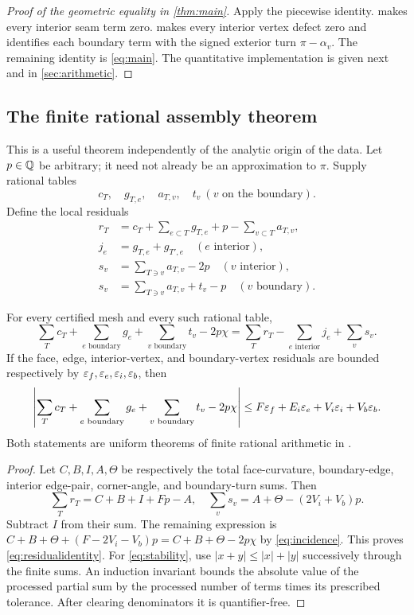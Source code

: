 \begin{proof}[Proof of the geometric equality in \cref{thm:main}]
Apply the piecewise identity.  makes every interior seam term zero.  makes every interior vertex defect zero and identifies each boundary term with the signed exterior turn $\pi-\alpha_v$. The remaining identity is \eqref{eq:main}. The quantitative implementation is given next and in \cref{sec:arithmetic}.
\end{proof}

\subsection{The finite rational assembly theorem}\label{sec:assembly}

This is a useful theorem independently of the analytic origin of the data. Let $p\in\mathbb Q$ be arbitrary; it need not already be an approximation to $\pi$. Supply rational tables
\[
c_T,\quad g_{T,e},\quad a_{T,v},\quad t_v\ (v\text{ on the boundary}).
\]
Define the local residuals
\begin{align*}
r_T&=c_T+\sum_{e\subset T}g_{T,e}+p-\sum_{v\subset T}a_{T,v},\\
j_e&=g_{T,e}+g_{T',e}\quad(e\text{ interior}),\\
s_v&=\sum_{T\ni v}a_{T,v}-2p\quad(v\text{ interior}),\\
s_v&=\sum_{T\ni v}a_{T,v}+t_v-p\quad(v\text{ boundary}).
\end{align*}

\begin{theorem}\label{thm:assembly}
For every certified mesh and every such rational table,
\begin{equation}\label{eq:residualidentity}
\boxed{\quad
\sum_Tc_T+\sum_{e\text{ boundary}}g_e+\sum_{v\text{ boundary}}t_v-2p\chi
=\sum_Tr_T-\sum_{e\text{ interior}}j_e+\sum_vs_v.\quad}
\end{equation}
If the face, edge, interior-vertex, and boundary-vertex residuals are bounded respectively by $\varepsilon_f,\varepsilon_e,\varepsilon_i,\varepsilon_b$, then
\begin{equation}\label{eq:stability}
\left|\sum_Tc_T+\sum_{e\text{ boundary}}g_e+\sum_{v\text{ boundary}}t_v-2p\chi\right|
\le F\varepsilon_f+E_i\varepsilon_e+V_i\varepsilon_i+V_b\varepsilon_b.
\end{equation}
Both statements are uniform theorems of finite rational arithmetic in \ipra.
\end{theorem}
\begin{proof}
Let $C,B,I,A,\Theta$ be respectively the total face-curvature, boundary-edge, interior edge-pair, corner-angle, and boundary-turn sums. Then
\[
\sum_Tr_T=C+B+I+Fp-A,
\quad \sum_vs_v=A+\Theta-(2V_i+V_b)p.
\]
Subtract $I$ from their sum. The remaining expression is
$C+B+\Theta+(F-2V_i-V_b)p=C+B+\Theta-2p\chi$
by \eqref{eq:incidence}. This proves \eqref{eq:residualidentity}.
For \eqref{eq:stability}, use $|x+y|\le|x|+|y|$ successively through the finite sums. An induction invariant bounds the absolute value of the processed partial sum by the processed number of terms times its prescribed tolerance. After clearing denominators it is quantifier-free.
\end{proof}

